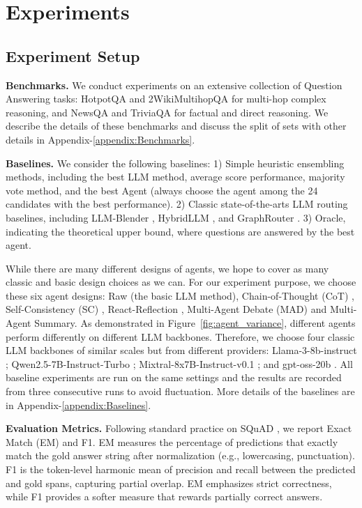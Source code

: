 \documentclass[11pt]{article}
\begin{document}
\section{Experiments}
\subsection{Experiment Setup}
\noindent \textbf{Benchmarks. }We conduct experiments on an extensive collection of Question Answering tasks: HotpotQA \cite{yang2018hotpotqa} and 2WikiMultihopQA \cite{ho20202wikimultihopqa} for multi-hop complex reasoning, and NewsQA \cite{trischler2017newsqa} and TriviaQA \cite{joshi2017triviaqa} for factual and direct reasoning. We describe the details of these benchmarks and discuss the split of sets with other details in Appendix-\ref{appendix:Benchmarks}.

\noindent \textbf{Baselines. } We consider the following baselines: 1) Simple heuristic ensembling methods, including the best LLM method, average score performance, majority vote method, and the best Agent (always choose the agent among the 24 candidates with the best performance). 2) Classic state-of-the-arts LLM routing baselines, including LLM-Blender \cite{jiang2023llm}, HybridLLM \cite{ding2024hybridllm}, and GraphRouter \cite{feng2024graphrouter}. 3) Oracle, indicating the theoretical upper bound, where questions are answered by the best agent. 

While there are many different designs of agents, we hope to cover as many classic and basic design choices as we can. For our experiment purpose, we choose these six agent designs: Raw (the basic LLM method), Chain-of-Thought (CoT) \cite{wei2022chain}, Self-Consistency (SC) \cite{wang2023selfconsistency}, React-Reflection \cite{yao2023react, shinn2023reflexion}, Multi-Agent Debate (MAD) \cite{du2024mad} and Multi-Agent Summary. As demonstrated in Figure~\ref{fig:agent_variance}, different agents perform differently on different LLM backbones. Therefore, we choose four classic LLM backbones of similar scales but from different providers: Llama-3-8b-instruct \cite{meta2024llama3}; Qwen2.5-7B-Instruct-Turbo \cite{qwen2025qwen2_5_7binstruct}; Mixtral-8x7B-Instruct-v0.1 \cite{mistral2023mixtral_8x7binstruct}; and gpt-oss-20b \cite{gptoss2025gpt_oss_20b}. All baseline experiments are run on the same settings and the results are recorded from three consecutive runs to avoid fluctuation. More details of the baselines are in Appendix-\ref{appendix:Baselines}. 

\noindent \textbf{Evaluation Metrics. }Following standard practice on SQuAD \cite{rajpurkar2016squad}, we report Exact Match (EM) and F1. EM measures the percentage of predictions that exactly match the gold answer string after normalization (e.g., lowercasing, punctuation). F1 is the token-level harmonic mean of precision and recall between the predicted and gold spans, capturing partial overlap. EM emphasizes strict correctness, while F1 provides a softer measure that rewards partially correct answers.
\end{document}
